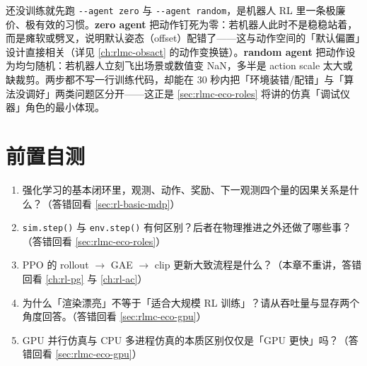 \begin{insight}\label{ins:rlmc-eco-zerorandom}
还没训练就先跑 \verb|--agent zero| 与 \verb|--agent random|，是机器人 RL 里一条极廉价、极有效的习惯。\textbf{zero agent} 把动作钉死为零：若机器人此时不是稳稳站着，而是瘫软或劈叉，说明默认姿态（offset）配错了——这与动作空间的「默认偏置」设计直接相关（详见 \cref{ch:rlmc-obsact} 的动作变换链）。\textbf{random agent} 把动作设为均匀随机：若机器人立刻飞出场景或数值变 NaN，多半是 action scale 太大或缺裁剪。两步都不写一行训练代码，却能在 30 秒内把「环境装错/配错」与「算法没调好」两类问题区分开——这正是 \cref{sec:rlmc-eco-roles} 将讲的仿真「调试仪器」角色的最小体现。
\end{insight}

\section*{前置自测}
\label{sec:rlmc-eco-selftest}

\begin{practice}
\begin{enumerate}
  \item 强化学习的基本闭环里，观测、动作、奖励、下一观测四个量的因果关系是什么？（答错回看 \cref{sec:rl-basic-mdp}）
  \item \verb|sim.step()| 与 \verb|env.step()| 有何区别？后者在物理推进之外还做了哪些事？（答错回看 \cref{sec:rlmc-eco-roles}）
  \item PPO 的 rollout $\to$ GAE $\to$ clip 更新大致流程是什么？（本章不重讲，答错回看 \cref{ch:rl-pg} 与 \cref{ch:rl-ac}）
  \item 为什么「渲染漂亮」不等于「适合大规模 RL 训练」？请从吞吐量与显存两个角度回答。（答错回看 \cref{sec:rlmc-eco-gpu}）
  \item GPU 并行仿真与 CPU 多进程仿真的本质区别仅仅是「GPU 更快」吗？（答错回看 \cref{sec:rlmc-eco-gpu}）
\end{enumerate}
\end{practice}

